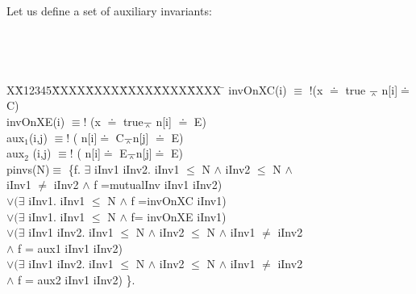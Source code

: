 \documentclass[conference]{IEEEtran}
\newlength{\fminilength}
\newenvironment{fmini}[1][\linewidth]
  {\setlength{\fminilength}{#1\fboxsep-2\fboxrule}%
   \vspace{2ex}\noindent\begin{lrbox}{\fminibox}\begin{minipage}{\fminilength}%
   \mbox{ }\hfill\vspace{-2.5ex}}%
  {\end{minipage}\end{lrbox}\vspace{1ex}\hspace{0ex}%
   \framebox{\usebox{\fminibox}}}
\newenvironment{specification}
{\noindent\scriptsize
\tt\begin{fmini}\begin{tabbing}X\=X12345\=XXXX\=XXXX\=XXXX\=XXXX\=XXXX
\=\+\kill} {\end{tabbing}\normalfont\end{fmini}}
\def \andc {\barwedge }
\def \negc {!}
\def \iInv {iInv}
\begin{document}




\begin{example}\label{example2}
Let us define a set of auxiliary invariants:

\begin{specification}
invOnXC(i)  $\equiv$ $\negc$(x $\doteq$ true $\andc$ n[i]$\doteq$ C)   \\

invOnXE(i)   $\equiv \negc$ (x $\doteq$ true$\andc$ n[i] $\doteq$ E)  \\


aux$_1$(i,j)   $\equiv \negc$ ( n[i]$\doteq$ C$\andc$n[j] $\doteq$ E)  \\

aux$_2$ (i,j) $\equiv \negc$  ( n[i]$\doteq$ E$\andc$n[j]$\doteq$ E)\\

  pinvs(N)$\equiv$ \{f. $\exists$ \iInv1 \iInv2. \iInv1 $\le$ N $\wedge$ \iInv2 $\le$ N $\wedge$\\
   \iInv1 $\ne$ \iInv2 $\wedge$   f =mutualInv   \iInv1 \iInv2) \\
 $ \vee(\exists$ \iInv1. \iInv1 $\le$ N $\wedge$  f =invOnXC  \iInv1)   \\
$\vee(\exists$ \iInv1. \iInv1 $\le$ N $\wedge$  f= invOnXE \iInv1)    \\
$\vee(\exists$ \iInv1 \iInv2. \iInv1 $\le$ N $\wedge$ \iInv2 $\le$ N $\wedge$ \iInv1 $\ne$ \iInv2 \\
$\wedge$ f =  aux1  \iInv1 \iInv2) \\
$\vee(\exists$ \iInv1 \iInv2. \iInv1 $\le$ N $\wedge$ \iInv2 $\le$ N $\wedge$ \iInv1 $\ne$ \iInv2 \\
$\wedge$ f =  aux2  \iInv1 \iInv2) \}.

\end{specification}


\end{example}
\end{document}
